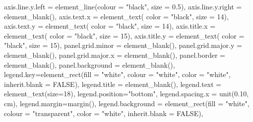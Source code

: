 \documentclass[
]{book}
\newenvironment{Shaded}{\begin{snugshade}}{\end{snugshade}}
\newcommand{\AttributeTok}[1]{\textcolor[rgb]{0.77,0.63,0.00}{#1}}
\newcommand{\ConstantTok}[1]{\textcolor[rgb]{0.00,0.00,0.00}{#1}}
\newcommand{\DecValTok}[1]{\textcolor[rgb]{0.00,0.00,0.81}{#1}}
\newcommand{\FloatTok}[1]{\textcolor[rgb]{0.00,0.00,0.81}{#1}}
\newcommand{\FunctionTok}[1]{\textcolor[rgb]{0.00,0.00,0.00}{#1}}
\newcommand{\NormalTok}[1]{#1}
\newcommand{\StringTok}[1]{\textcolor[rgb]{0.31,0.60,0.02}{#1}}
\begin{document}
\begin{Shaded}
\begin{Highlighting}[]
           \AttributeTok{axis.line.y.left  =} \FunctionTok{element\_line}\NormalTok{(}\AttributeTok{colour =} \StringTok{"black"}\NormalTok{, }\AttributeTok{size =} \FloatTok{0.5}\NormalTok{),}
           \AttributeTok{axis.line.y.right =} \FunctionTok{element\_blank}\NormalTok{(),}
           \AttributeTok{axis.text.x  =} \FunctionTok{element\_text}\NormalTok{( }\AttributeTok{color =} \StringTok{"black"}\NormalTok{, }\AttributeTok{size =} \DecValTok{14}\NormalTok{),}
           \AttributeTok{axis.text.y  =} \FunctionTok{element\_text}\NormalTok{( }\AttributeTok{color =} \StringTok{"black"}\NormalTok{, }\AttributeTok{size =} \DecValTok{14}\NormalTok{),}
           \AttributeTok{axis.title.x =} \FunctionTok{element\_text}\NormalTok{( }\AttributeTok{color =} \StringTok{"black"}\NormalTok{, }\AttributeTok{size =} \DecValTok{15}\NormalTok{),}
           \AttributeTok{axis.title.y =} \FunctionTok{element\_text}\NormalTok{( }\AttributeTok{color =} \StringTok{"black"}\NormalTok{, }\AttributeTok{size =} \DecValTok{15}\NormalTok{),}
           \AttributeTok{panel.grid.minor =} \FunctionTok{element\_blank}\NormalTok{(),}
           \AttributeTok{panel.grid.major.y =} \FunctionTok{element\_blank}\NormalTok{(),}
           \AttributeTok{panel.grid.major.x =} \FunctionTok{element\_blank}\NormalTok{(),}
           \AttributeTok{panel.border =} \FunctionTok{element\_blank}\NormalTok{(),}
           \AttributeTok{panel.background =} \FunctionTok{element\_blank}\NormalTok{(),}
           \AttributeTok{legend.key=}\FunctionTok{element\_rect}\NormalTok{(}\AttributeTok{fill =} \StringTok{"white"}\NormalTok{, }\AttributeTok{colour =} \StringTok{"white"}\NormalTok{,}
                                   \AttributeTok{color =} \StringTok{"white"}\NormalTok{, }\AttributeTok{inherit.blank =} \ConstantTok{FALSE}\NormalTok{),}
           \AttributeTok{legend.title =} \FunctionTok{element\_blank}\NormalTok{(),}
           \AttributeTok{legend.text  =} \FunctionTok{element\_text}\NormalTok{(}\AttributeTok{size=}\DecValTok{18}\NormalTok{),}
           \AttributeTok{legend.position=}\StringTok{"bottom"}\NormalTok{,}
           \AttributeTok{legend.spacing.x =} \FunctionTok{unit}\NormalTok{(}\FloatTok{0.10}\NormalTok{, }\StringTok{\textquotesingle{}cm\textquotesingle{}}\NormalTok{),}
           \AttributeTok{legend.margin=}\FunctionTok{margin}\NormalTok{(),}
           \AttributeTok{legend.background =} \FunctionTok{element\_rect}\NormalTok{(}\AttributeTok{fill =} \StringTok{"white"}\NormalTok{, }\AttributeTok{colour =} \StringTok{"transparent"}\NormalTok{,}
                                            \AttributeTok{color =} \StringTok{"white"}\NormalTok{, }\AttributeTok{inherit.blank =} \ConstantTok{FALSE}\NormalTok{),}

\end{Highlighting}
\end{Shaded}
\end{document}
